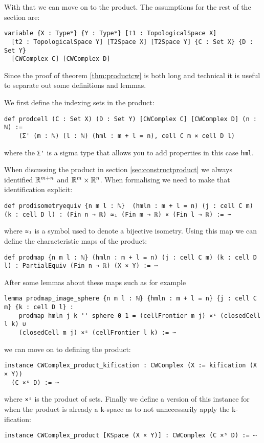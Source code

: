 With that we can move on to the product. 
The assumptions for the rest of the section are:

\begin{lstlisting}
variable {X : Type*} {Y : Type*} [t1 : TopologicalSpace X] 
  [t2 : TopologicalSpace Y] [T2Space X] [T2Space Y] {C : Set X} {D : Set Y} 
  [CWComplex C] [CWComplex D]
\end{lstlisting}

Since the proof of theorem \ref{thm:productcw} is both long and technical it is useful to separate out some definitions and lemmas. 

We first define the indexing sets in the product:

\begin{lstlisting}
def prodcell (C : Set X) (D : Set Y) [CWComplex C] [CWComplex D] (n : ℕ) :=
    (Σ' (m : ℕ) (l : ℕ) (hml : m + l = n), cell C m × cell D l)
\end{lstlisting}

where the \lstinline{Σ'} is a sigma type that allows you to add properties in this case \lstinline{hml}. 

When discussing the product in section \ref{sec:constructproduct} we always identified $\mathbb{R}^{m + n}$ and $\mathbb{R}^m \times \mathbb{R}^n$. 
When formalising we need to make that identification explicit: 

\begin{lstlisting}
def prodisometryequiv {n m l : ℕ}  (hmln : m + l = n) (j : cell C m) (k : cell D l) : (Fin n → ℝ) ≃ᵢ (Fin m → ℝ) × (Fin l → ℝ) := ⋯
\end{lstlisting}

where \lstinline{≃ᵢ} is a symbol used to denote a bijective isometry. 
Using this map we can define the characteristic maps of the product: 

\begin{lstlisting}
def prodmap {n m l : ℕ} (hmln : m + l = n) (j : cell C m) (k : cell D l) : PartialEquiv (Fin n → ℝ) (X × Y) := ⋯
\end{lstlisting}

After some lemmas about these maps such as for example 

\begin{lstlisting}
lemma prodmap_image_sphere {n m l : ℕ} {hmln : m + l = n} {j : cell C m} {k : cell D l} :
    prodmap hmln j k '' sphere 0 1 = (cellFrontier m j) ×ˢ (closedCell l k) ∪
    (closedCell m j) ×ˢ (cellFrontier l k) := ⋯
\end{lstlisting}

we can move on to defining the product: 

\begin{lstlisting}
instance CWComplex_product_kification : CWComplex (X := kification (X × Y)) 
  (C ×ˢ D) := ⋯
\end{lstlisting}

where \lstinline{×ˢ} is the product of sets.
Finally we define a version of this instance for when the product is already a k-space as to not unnecessarily apply the k-ification: 

\begin{lstlisting}
instance CWComplex_product [KSpace (X × Y)] : CWComplex (C ×ˢ D) := ⋯
\end{lstlisting}